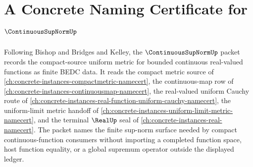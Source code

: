 \chapter{A Concrete Naming Certificate for $\ContinuousSupNormUp$}
\label{ch:concrete-instances-continuous-sup-norm-namecert}

Following Bishop and Bridges and Kelley, the $\ContinuousSupNormUp$ packet records the compact-source uniform metric for bounded continuous real-valued functions as finite BEDC data. It reads the compact metric source of \autoref{ch:concrete-instances-compactmetric-namecert}, the continuous-map row of \autoref{ch:concrete-instances-continuousmap-namecert}, the real-valued uniform Cauchy route of \autoref{ch:concrete-instances-real-function-uniform-cauchy-namecert}, the uniform-limit metric handoff of \autoref{ch:concrete-instances-uniform-limit-metric-namecert}, and the terminal $\RealUp$ seal of \autoref{ch:concrete-instances-real-namecert}. The packet names the finite sup-norm surface needed by compact continuous-function consumers without importing a completed function space, host function equality, or a global supremum operator outside the displayed ledger.

